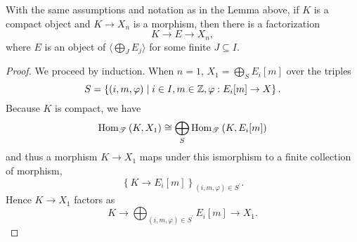 \documentclass[dissertation.tex]{subfiles}
\begin{document}
\begin{lem}\label{hocolimfactorization}
  With the same assumptions and notation as in the Lemma above, if $K$ is a compact object and $K \rightarrow X_n$ is a morphism, then there is a factorization 
  $$K \rightarrow E \rightarrow X_n,$$
  where $E$ is an object of $\langle \bigoplus_{J}E_j \rangle$ for some finite $J \subseteq I$.
  \begin{proof}
    We proceed by induction.
    When $n = 1$, $X_1 = \bigoplus_S E_i[m]$ over the triples
    $$S = \left\{(i,m,\varphi) \;\middle\vert\; i \in I, m \in \mathbb{Z}, \varphi : E_i[m] \rightarrow X\right\}.$$
    Because $K$ is compact, we have
    $$\operatorname{Hom}_{\mathscr{T}}\left(K,X_1\right) \cong \bigoplus_S\operatorname{Hom}_{\mathscr{T}}\left(K, E_i[m]\right)$$
    and thus a morphism $K \rightarrow X_1$ maps under this ismorphism to a finite collection of morphism, $$\left\{K \rightarrow E_i[m]\right\}_{(i,m,\varphi) \in S^\prime}.$$
    Hence $K \rightarrow X_1$ factors as
    $$K \rightarrow \bigoplus_{(i,m,\varphi) \in S^\prime}E_i[m] \rightarrow X_1.$$


\end{proof}
\end{lem}
\end{document}
